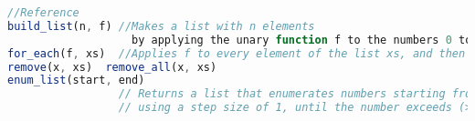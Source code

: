 \documentclass[11pt]{article}
\begin{document}
\begin{lstlisting}[language=JavaScript]
//Reference 
build_list(n, f) //Makes a list with n elements 
				   by applying the unary function f to the numbers 0 to n - 1.
for_each(f, xs)  //Applies f to every element of the list xs, and then returns true.
remove(x, xs)  remove_all(x, xs)
enum_list(start, end)
				 // Returns a list that enumerates numbers starting from start 
				 //	using a step size of 1, until the number exceeds (>) end.
\end{lstlisting}
\clearpage
\end{document}
